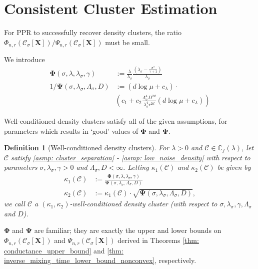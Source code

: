 \documentclass{article}
\newcommand{\1}{\mathbf{1}}
\newcommand{\Phibf}{\mathbf{\Phi}}
\newcommand{\Psibf}{\mathbf{\Psi}}
\newcommand{\Xbf}{\mathbf{X}}
\newcommand{\Cbb}{\mathbb{C}}
\newcommand{\Cset}{\mathcal{C}}
\newcommand{\Csig}{\Cset_{\sigma}}
\theoremstyle{aldenthm}
\newtheorem{definition}{Definition}
\theoremstyle{aldenrmrk}
\begin{document}
\section{Consistent Cluster Estimation}
\label{sec: consistent_cluster_estimation_with_ppr}

For PPR to successfully recover density clusters, the ratio $\Phi_{n,r}(\Csig[\Xbf])/\Psi_{n,r}(\Csig[\Xbf])$ must be small. 

We introduce
\begin{align*}
\mathbf{\Phi}(\sigma, \lambda,\lambda_{\sigma},\gamma) & := \frac{\lambda}{\lambda_{\sigma}} \frac{(\lambda_{\sigma} - \frac{\sigma^{\gamma}}{\gamma+1})}{\lambda_{\sigma}} \\
1 / \mathbf{\Psi}(\sigma, \lambda_{\sigma}, \Lambda_{\sigma}, D) & := \left(d \log \mu + c_{\lambda} \right) \cdot \nonumber \\ 
& \left(c_1 + c_2 \frac{\Lambda_{\sigma}^4D^{2d}}{\lambda_{\sigma}^4r^{2d}}\left(d \log \mu + c_{\lambda}\right)\right)
\end{align*}

Well-conditioned density clusters satisfy all of the given assumptions, for parameters which results in `good' values of $\Phibf$ and $\Psibf$.
\begin{definition}[Well-conditioned density clusters]
	For $\lambda > 0$ and $\Cset \in \Cbb_f(\lambda)$, let $\Cset$ satisfy \ref{asmp: cluster_separation} - \ref{asmp: low_noise_density} with respect to parameters $\sigma, \lambda_{\sigma}, \gamma > 0$ and $\Lambda_{\sigma}, D < \infty.$ Letting $\kappa_1(\Cset)$ and $\kappa_2(\Cset)$ be given by
	\begin{align*}
	\kappa_1(\Cset) & := \frac{\mathbf{\Phi}(\sigma, \lambda,\lambda_{\sigma},\gamma)}{\mathbf{\Psi}(\sigma, \lambda_{\sigma}, \Lambda_{\sigma}, D)} \\
	\kappa_2(\Cset) & := \kappa_1(\Cset) \cdot \sqrt{\mathbf{\Psi}(\sigma, \lambda_{\sigma}, \Lambda_{\sigma}, D)},
	\end{align*}
	we call $\Cset$ a \textrm{$(\kappa_1, \kappa_2)$-well-conditioned density cluster (with respect to $\sigma, \lambda_{\sigma}, \gamma, \Lambda_{\sigma}$ and $D$).}
\end{definition}

$\Phibf$ and $\Psibf$ are familiar; they are exactly the upper and lower bounds on $\Phi_{n,r}(\Csig[\Xbf])$ and $\Psi_{n,r}(\Csig[\Xbf])$ derived in Theorems \ref{thm: conductance_upper_bound} and \ref{thm: inverse_mixing_time_lower_bound_nonconvex}, respectively.
\end{document}
